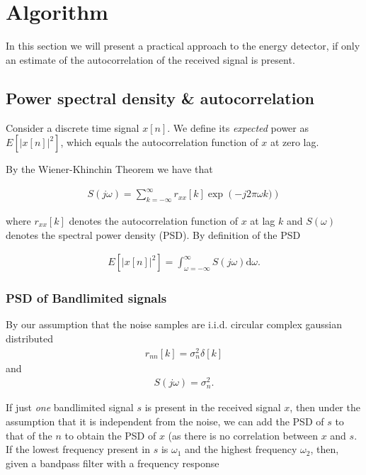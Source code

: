 \section{Algorithm}
In this section we will present a practical approach to the energy detector, if only an estimate of the autocorrelation of the received signal is present.

 \subsection{Power spectral density \& autocorrelation}
Consider a discrete time signal $x[n]$. We define its \emph{expected} power as $E\left[\left|x[n]\right|^2\right]$, which equals the autocorrelation function of $x$ at zero lag. 

By the Wiener-Khinchin Theorem we have that 

 \begin{align*}
S(j\omega) = \sum_{k=-\infty}^{\infty} r_{xx}[k] \exp \left( -j2\pi \omega k) \right)
 \end{align*}

where $r_{xx}[k]$ denotes the autocorrelation function of $x$ at lag $k$ and $S(\omega)$ denotes the spectral power density (PSD).
By definition of the PSD 

\begin{align*}
E\left[\left|x[n]\right|^2\right] = \int_{\omega = -\infty}^{\infty} S(j\omega)\text{d}\omega.
\end{align*}

\subsubsection{PSD of Bandlimited signals}
By our assumption that the noise samples are i.i.d. circular complex gaussian distributed
\begin{align*}
    r_{nn}[k] = \sigma^2_n \delta[k]
\end{align*}
and 
\begin{align*}
    S(j\omega) = \sigma^2_n.
\end{align*}

If just \emph{one} bandlimited signal $s$ is present in the received signal $x$, then under the assumption that it is independent from the noise, we can add the PSD of $s$ to that of the $n$ to obtain the PSD of $x$ (as there is no correlation between $x$ and $s$. If the lowest frequency present in $s$ is $\omega_1$ and the highest frequency $\omega_2$, then, given a bandpass filter with a frequency response 

